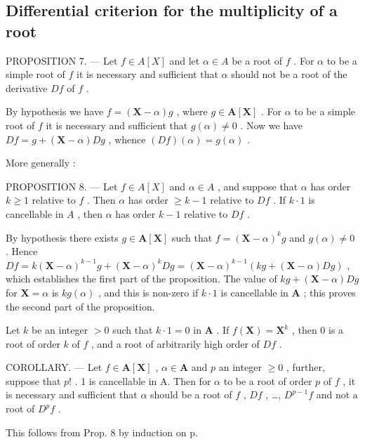 \subsection{Differential criterion for the multiplicity of a root}

PROPOSITION 7. --- Let \(f \in A[X]\) and let \(\alpha \in A\) be a root of \(f\) . For \(\alpha\) to be a simple root of \(f\) it is necessary and sufficient that \(\alpha\) should not be a root of the derivative \(Df\) of \(f\) .

By hypothesis we have \(f = (\mathbf{X} - \alpha)g\) , where \(g \in \mathbf{A}[\mathbf{X}]\) . For \(\alpha\) to be a simple root of \(f\) it is necessary and sufficient that \(g(\alpha) \neq 0\) . Now we have \(Df = g + (\mathbf{X} - \alpha)Dg\) , whence \((Df)(\alpha) = g(\alpha)\) .

More generally :

PROPOSITION 8. --- Let \(f \in A[X]\) and \(\alpha \in A\) , and suppose that \(\alpha\) has order \(k \geqslant 1\) relative to \(f\) . Then \(\alpha\) has order \(\geqslant k - 1\) relative to \(Df\) . If \(k \cdot 1\) is cancellable in \(A\) , then \(\alpha\) has order \(k - 1\) relative to \(Df\) .

By hypothesis there exists \(g \in \mathbf{A}[\mathbf{X}]\) such that \(f = (\mathbf{X} - \alpha)^k g\) and \(g(\alpha) \neq 0\) . Hence \(Df = k(\mathbf{X} - \alpha)^{k-1}g + (\mathbf{X} - \alpha)^k Dg = (\mathbf{X} - \alpha)^{k-1}(kg + (\mathbf{X} - \alpha)Dg)\) , which establishes the first part of the proposition. The value of \(kg + (\mathbf{X} - \alpha)Dg\) for \(\mathbf{X} = \alpha\) is \(kg(\alpha)\) , and this is non-zero if \(k \cdot 1\) is cancellable in \(\mathbf{A}\) ; this proves the second part of the proposition.

Let \(k\) be an integer \(> 0\) such that \(k \cdot 1 = 0\) in \(\mathbf{A}\) . If \(f(\mathbf{X}) = \mathbf{X}^k\) , then \(0\) is a root of order \(k\) of \(f\) , and a root of arbitrarily high order of \(Df\) .

COROLLARY. --- Let \(f \in \mathbf{A}[\mathbf{X}]\) , \(\alpha \in \mathbf{A}\) and \(p\) an integer \(\geqslant 0\) , further, suppose that \(p!\) . 1 is cancellable in A. Then for \(\alpha\) to be a root of order \(p\) of \(f\) , it is necessary and sufficient that \(\alpha\) should be a root of \(f\) , \(Df\) , \ldots, \(D^{p-1}f\) and not a root of \(D^p f\) .

This follows from Prop. 8 by induction on p.

